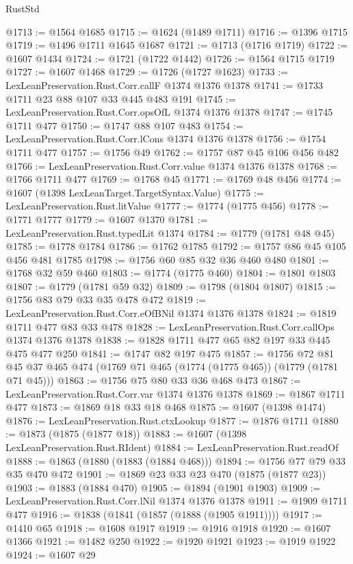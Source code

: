 \begin{lexlean}{RustStd}
\begin{coremodule}
@1713 := @1564 @1685
@1715 := @1624 (@1489 @1711)
@1716 := @1396 @1715
@1719 := @1496 @1711 @1645 @1687
@1721 := @1713 (@1716 @1719)
@1722 := @1607 @1434
@1724 := @1721 (@1722 @1442)
@1726 := @1564 @1715 @1719
@1727 := @1607 @1468
@1729 := @1726 (@1727 @1623)
@1733 := LexLeanPreservation.Rust.Corr.callF @1374 @1376 @1378
@1741 := @1733 @1711 @23 @88 @107 @33 @445 @483 @191
@1745 := LexLeanPreservation.Rust.Corr.opsOfL @1374 @1376 @1378
@1747 := @1745 @1711 @477
@1750 := @1747 @88 @107 @483
@1754 := LexLeanPreservation.Rust.Corr.lCons @1374 @1376 @1378
@1756 := @1754 @1711 @477
@1757 := @1756 @49
@1762 := @1757 @87 @45 @106 @456 @482
@1766 := LexLeanPreservation.Rust.Corr.value @1374 @1376 @1378
@1768 := @1766 @1711 @477
@1769 := @1768 @45
@1771 := @1769 @48 @456
@1774 := @1607 (@1398 LexLeanTarget.TargetSyntax.Value)
@1775 := LexLeanPreservation.Rust.litValue
@1777 := @1774 (@1775 @456)
@1778 := @1771 @1777
@1779 := @1607 @1370
@1781 := LexLeanPreservation.Rust.typedLit @1374
@1784 := @1779 (@1781 @48 @45)
@1785 := @1778 @1784
@1786 := @1762 @1785
@1792 := @1757 @86 @45 @105 @456 @481 @1785
@1798 := @1756 @60 @85 @32 @36 @460 @480
@1801 := @1768 @32 @59 @460
@1803 := @1774 (@1775 @460)
@1804 := @1801 @1803
@1807 := @1779 (@1781 @59 @32)
@1809 := @1798 (@1804 @1807)
@1815 := @1756 @83 @79 @33 @35 @478 @472
@1819 := LexLeanPreservation.Rust.Corr.eOfBNil @1374 @1376 @1378
@1824 := @1819 @1711 @477 @83 @33 @478
@1828 := LexLeanPreservation.Rust.Corr.callOps @1374 @1376 @1378
@1838 := @1828 @1711 @477 @65 @82 @197 @33 @445 @475 @477 @250
@1841 := @1747 @82 @197 @475
@1857 := @1756
    @72
    @81
    @45
    @37
    @465
    @474
    (@1769 @71 @465 (@1774 (@1775 @465)) (@1779 (@1781 @71 @45)))
@1863 := @1756 @75 @80 @33 @36 @468 @473
@1867 := LexLeanPreservation.Rust.Corr.var @1374 @1376 @1378
@1869 := @1867 @1711 @477
@1873 := @1869 @18 @33 @18 @468
@1875 := @1607 (@1398 @1474)
@1876 := LexLeanPreservation.Rust.ctxLookup
@1877 := @1876 @1711
@1880 := @1873 (@1875 (@1877 @18))
@1883 := @1607 (@1398 LexLeanPreservation.Rust.RIdent)
@1884 := LexLeanPreservation.Rust.readOf
@1888 := @1863 (@1880 (@1883 (@1884 @468)))
@1894 := @1756 @77 @79 @33 @35 @470 @472
@1901 := @1869 @23 @33 @23 @470 (@1875 (@1877 @23))
@1903 := @1883 (@1884 @470)
@1905 := @1894 (@1901 @1903)
@1909 := LexLeanPreservation.Rust.Corr.lNil @1374 @1376 @1378
@1911 := @1909 @1711 @477
@1916 := @1838 (@1841 (@1857 (@1888 (@1905 @1911))))
@1917 := @1410 @65
@1918 := @1608 @1917
@1919 := @1916 @1918
@1920 := @1607 @1366
@1921 := @1482 @250
@1922 := @1920 @1921
@1923 := @1919 @1922
@1924 := @1607 @29

\end{coremodule}
\end{lexlean}
